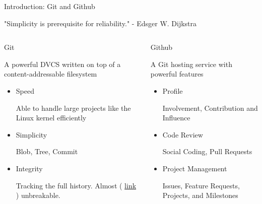 \begin{frame}{Introduction: Git and Github}
  \begin{flushleft}
    "Simplicity is prerequisite for reliability." - Edsger W. Dijkstra
  \end{flushleft}
  \begin{columns}[t]
    \begin{column}{0.5\textwidth}
      Git
      \begin{flushleft}
        \footnotesize
        A powerful DVCS written on top of a content-addressable filesystem
      \end{flushleft}
      \begin{itemize}
        \item Speed 
        \begin{flushleft}
          \footnotesize
          Able to handle large projects like the Linux kernel efficiently
        \end{flushleft}
        \item Simplicity
        \begin{flushleft}
          \footnotesize
          Blob, Tree, Commit
        \end{flushleft}
        \item Integrity
        \begin{flushleft}
          \footnotesize
          Tracking the full history.
          Almost (
          \href{https://www.theregister.co.uk/2017/02/23/google_first_sha1_collision}{link}
          ) unbreakable.
        \end{flushleft}
      \end{itemize}
    \end{column}
    \begin{column}{0.5\textwidth}
      Github
      \begin{flushleft}
        \footnotesize
        A Git hosting service with powerful features
      \end{flushleft}
      \begin{itemize}
        \item Profile
        \begin{flushleft}
          \footnotesize
          Involvement, Contribution and Influence
        \end{flushleft}
        \item Code Review
        \begin{flushleft}
          \footnotesize
          Social Coding, Pull Requests
        \end{flushleft}
        \item Project Management
        \begin{flushleft}
          \footnotesize
          Issues, Feature Requests, Projects, and Milestones
        \end{flushleft}
      \end{itemize}
    \end{column}
  \end{columns}
\end{frame}
